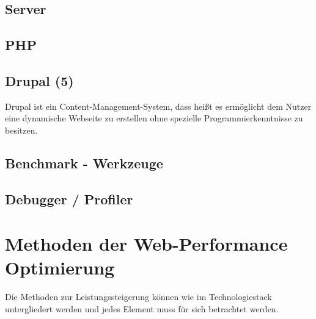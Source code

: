 
\subsection{Server}
\subsection{PHP}
\subsection{Drupal (5)}
Drupal ist ein Content-Management-System, dass heißt es ermöglicht dem Nutzer eine dynamische Webseite zu erstellen ohne spezielle Programmierkenntnisse zu besitzen. 

\subsection{Benchmark - Werkzeuge}
\subsection{Debugger / Profiler}
\section{Methoden der Web-Performance Optimierung}
Die Methoden zur Leistungssteigerung können wie im Technologiestack untergliedert werden und jedes Element muss für sich betrachtet werden.

